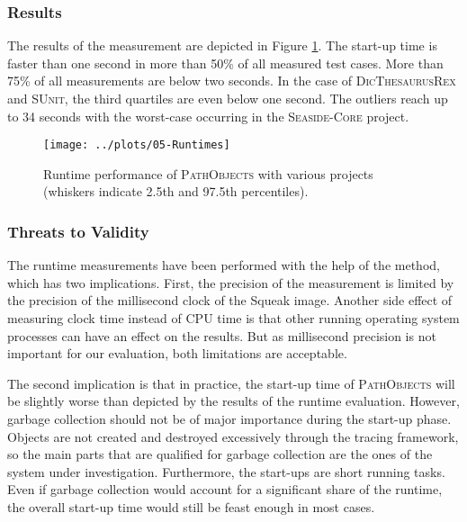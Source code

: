 \subsubsection{Results}
The results of the measurement are depicted in Figure \ref{f:DiscussionRuntime}.
The start-up time is faster than one second in more than 50\% of all measured test cases.
More than 75\% of all measurements are below two seconds.
In the case of \textsc{DicThesaurusRex} and \textsc{SUnit}, the third quartiles are even below one second.
The outliers reach up to 34 seconds with the worst-case occurring in the \textsc{Seaside-Core} project.

\begin{figure}[h!]
	\centering
	\texttt{[image: ../plots/05-Runtimes]}
	\caption[Runtime Performance of \textsc{PathObjects}]{Runtime performance of \textsc{PathObjects} with various projects (whiskers indicate 2.5th and 97.5th percentiles).}
	\label{f:DiscussionRuntime}
\end{figure}

\subsubsection{Threats to Validity}
The runtime measurements have been performed with the help of the  method, which has two implications.
First, the precision of the measurement is limited by the precision of the millisecond clock of the Squeak image.
Another side effect of measuring clock time instead of CPU time is that other running operating system processes can have an effect on the results.
But as millisecond precision is not important for our evaluation, both limitations are acceptable.

The second implication is that in practice, the start-up time of \textsc{PathObjects} will be slightly worse than depicted by the results of the runtime evaluation.
However, garbage collection should not be of major importance during the start-up phase.
Objects are not created and destroyed excessively through the tracing framework, so the main parts that are qualified for garbage collection are the ones of the system under investigation.
Furthermore, the start-ups are short running tasks.
Even if garbage collection would account for a significant share of the runtime, the overall start-up time would still be feast enough in most cases.

